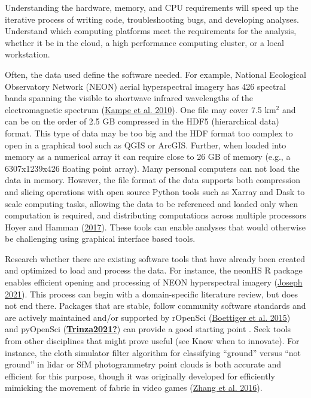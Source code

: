 \documentclass[
  12pt,
]{article}
\begin{document}
Understanding the hardware, memory, and CPU requirements will speed up
the iterative process of writing code, troubleshooting bugs, and
developing analyses. Understand which computing platforms meet the
requirements for the analysis, whether it be in the cloud, a high
performance computing cluster, or a local workstation.

Often, the data used define the software needed. For example, National
Ecological Observatory Network (NEON) aerial hyperspectral imagery has
426 spectral bands spanning the visible to shortwave infrared
wavelengths of the electromagnetic spectrum
(\protect\hyperlink{ref-kampe2010neon}{Kampe et al. 2010}). One file may
cover 7.5 km\(^2\) and can be on the order of 2.5 GB compressed in the
HDF5 (hierarchical data) format. This type of data may be too big and
the HDF format too complex to open in a graphical tool such as QGIS or
ArcGIS. Further, when loaded into memory as a numerical array it can
require close to 26 GB of memory (e.g., a 6307x1239x426 floating point
array). Many personal computers can not load the data in memory.
However, the file format of the data supports both compression and
slicing operations with open source Python tools such as Xarray and Dask
to scale computing tasks, allowing the data to be referenced and loaded
only when computation is required, and distributing computations across
multiple processors Hoyer and Hamman
(\protect\hyperlink{ref-hoyer2017xarray}{2017}). These tools can enable
analyses that would otherwise be challenging using graphical interface
based tools.

Research whether there are existing software tools that have already
been created and optimized to load and process the data. For instance,
the neonHS R package enables efficient opening and processing of NEON
hyperspectral imagery
(\protect\hyperlink{ref-max_joseph_2021_4641288}{Joseph 2021}). This
process can begin with a domain-specific literature review, but does not
end there. Packages that are stable, follow community software standards
and are actively maintained and/or supported by rOpenSci
(\protect\hyperlink{ref-boettiger2015building}{Boettiger et al. 2015})
and pyOpenSci (\protect\hyperlink{ref-Trinza2021}{\textbf{Trinza2021?}})
can provide a good starting point . Seek tools from other disciplines
that might prove useful (see Know when to innovate). For instance, the
cloth simulator filter algorithm for classifying ``ground'' versus ``not
ground'' in lidar or SfM photogrammetry point clouds is both accurate
and efficient for this purpose, though it was originally developed for
efficiently mimicking the movement of fabric in video games
(\protect\hyperlink{ref-zhang2016easy}{Zhang et al. 2016}).
\end{document}
